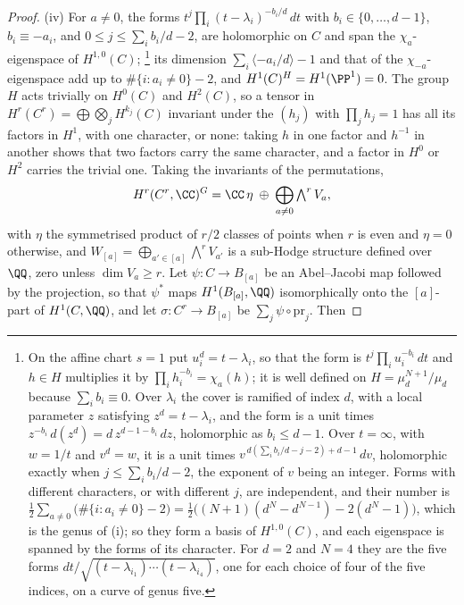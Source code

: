 \begin{proof}
(iv) For $a\ne0$, the forms
$t^{j}\prod_{i}(t-\lambda_{i})^{-b_{i}/d}\,dt$ with $b_{i}\in\{0,\dots,d-1\}$,
$b_{i}\equiv-a_{i}$, and $0\le j\le\sum_{i}b_{i}/d-2$, are holomorphic on $C$
and span the $\chi_{a}$-eigenspace of $H^{1,0}(C)$;%
\footnote{On the affine chart $s=1$ put $u_{i}^{d}=t-\lambda_{i}$, so that the
form is $t^{j}\prod_{i}u_{i}^{-b_{i}}\,dt$ and $h\in H$ multiplies it by
$\prod_{i}h_{i}^{-b_{i}}=\chi_{a}(h)$; it is well defined on
$H=\mu_{d}^{N+1}/\mu_{d}$ because $\sum_{i}b_{i}\equiv0$. Over $\lambda_{i}$
the cover is ramified of index $d$, with a local parameter $z$ satisfying
$z^{d}=t-\lambda_{i}$, and the form is a unit times
$z^{-b_{i}}\,d(z^{d})=d\,z^{d-1-b_{i}}\,dz$, holomorphic as $b_{i}\le d-1$.
Over $t=\infty$, with $w=1/t$ and $v^{d}=w$, it is a unit times
$v^{\,d(\sum_{i}b_{i}/d-j-2)+d-1}\,dv$, holomorphic exactly when
$j\le\sum_{i}b_{i}/d-2$, the exponent of $v$ being an integer. Forms with
different characters, or with different $j$, are independent, and their
number is
$\tfrac12\sum_{a\ne0}\bigl(\#\{i:a_{i}\ne0\}-2\bigr)
=\tfrac12\bigl((N+1)(d^{N}-d^{N-1})-2(d^{N}-1)\bigr)$, which is the genus of
(i); so they form a basis of $H^{1,0}(C)$, and each eigenspace is spanned by
the forms of its character. For $d=2$ and $N=4$ they are the five forms
$dt/\sqrt{(t-\lambda_{i_{1}})\cdots(t-\lambda_{i_{4}})}$, one for each choice
of four of the five indices, on a curve of genus five.}
its dimension
$\sum_{i}\langle-a_{i}/d\rangle-1$ and that of the $\chi_{-a}$-eigenspace add up
to $\#\{i:a_{i}\ne0\}-2$, and $H^{1}(C)^{H}=H^{1}(\PP^{1})=0$. The group $H$
acts trivially on $H^{0}(C)$ and $H^{2}(C)$, so a tensor in
$H^{r}(C^{r})=\bigoplus\bigotimes_{j}H^{k_{j}}(C)$ invariant under the
$(h_{j})$ with $\prod_{j}h_{j}=1$ has all its factors in $H^{1}$, with one
character, or none: taking $h$ in one factor and $h^{-1}$ in another shows
that two factors carry the same character, and a factor in $H^{0}$ or
$H^{2}$ carries the trivial one. Taking the invariants of the permutations,
\[
  H^{r}(C^{r},\CC)^{G}=\CC\,\eta\;\oplus\;\bigoplus_{a\ne0}\textstyle\bigwedge^{r}V_{a},
\]
with $\eta$ the symmetrised product of $r/2$ classes of points when $r$ is
even and $\eta=0$ otherwise, and $W_{[a]}=\bigoplus_{a'\in[a]}\bigwedge^{r}V_{a'}$
is a sub-Hodge structure defined over $\QQ$, zero unless $\dim V_{a}\ge r$.
Let $\psi\colon C\to B_{[a]}$ be an Abel--Jacobi map followed by the
projection, so that $\psi^{*}$ maps $H^{1}(B_{[a]},\QQ)$ isomorphically onto
the $[a]$-part of $H^{1}(C,\QQ)$, and let $\sigma\colon C^{r}\to B_{[a]}$ be
$\sum_{j}\psi\circ\mathrm{pr}_{j}$. Then

\end{proof}
